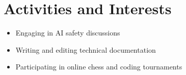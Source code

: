 \documentclass[a4paper,10pt]{article}
\begin{document}
\section*{Activities and Interests}
\begin{itemize}
    \item Engaging in AI safety discussions
    \item Writing and editing technical documentation
    \item Participating in online chess and coding tournaments
\end{itemize}
\end{document}
